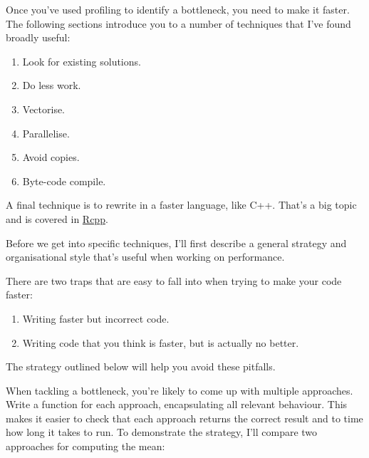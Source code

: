 Once you've used profiling to identify a bottleneck, you need to make it
faster. The following sections introduce you to a number of techniques
that I've found broadly useful: 

\begin{enumerate}
\def\labelenumi{\arabic{enumi}.}
\itemsep1pt\parskip0pt
\item
  Look for existing solutions.
\item
  Do less work.
\item
  Vectorise.
\item
  Parallelise.
\item
  Avoid copies.
\item
  Byte-code compile.
\end{enumerate}

A final technique is to rewrite in a faster language, like C++. That's a
big topic and is covered in \hyperref[rcpp]{Rcpp}.

Before we get into specific techniques, I'll first describe a general
strategy and organisational style that's useful when working on
performance.


There are two traps that are easy to fall into when trying to make your
code faster:

\begin{enumerate}
\def\labelenumi{\arabic{enumi}.}
\itemsep1pt\parskip0pt
\item
  Writing faster but incorrect code.
\item
  Writing code that you think is faster, but is actually no better.
\end{enumerate}

The strategy outlined below will help you avoid these pitfalls.

When tackling a bottleneck, you're likely to come up with multiple
approaches. Write a function for each approach, encapsulating all
relevant behaviour. This makes it easier to check that each approach
returns the correct result and to time how long it takes to run. To
demonstrate the strategy, I'll compare two approaches for computing the
mean:

